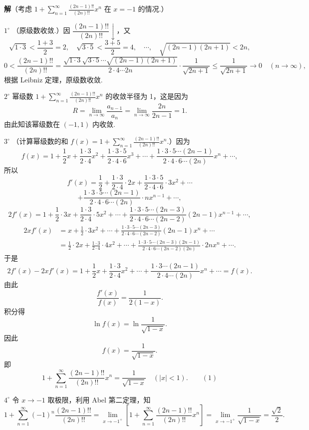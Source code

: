 \documentclass[UTF8,12pt,a4paper,fontset=fandol]{ctexart}
\begin{document}
\noindent\textbf{解}\quad （考虑 $\displaystyle 1+\sum_{n=1}^{\infty}\frac{(2n-1)!!}{(2n)!!}x^n$ 在 $x=-1$ 的情况.）

$1^\circ$ （原级数收敛.）因 $\dfrac{(2n-1)!!}{(2n)!!}\downarrow$，又
\[
  \sqrt{1\cdot3}<\frac{1+3}{2}=2,\quad
  \sqrt{3\cdot5}<\frac{3+5}{2}=4,\quad\cdots,\quad
  \sqrt{(2n-1)(2n+1)}<2n,
\]
\[
  0<\frac{(2n-1)!!}{(2n)!!}
  =\frac{\sqrt{1\cdot3}\sqrt{3\cdot5}\cdots\sqrt{(2n-1)(2n+1)}}{2\cdot4\cdots2n}\cdot\frac1{\sqrt{2n+1}}
  \le\frac1{\sqrt{2n+1}}\to0\quad(n\to\infty),
\]
根据 Leibniz 定理，原级数收敛.

$2^\circ$ 幂级数 $\displaystyle 1+\sum_{n=1}^{\infty}\frac{(2n-1)!!}{(2n)!!}x^n$ 的收敛半径为 1，这是因为
\[
  R=\lim_{n\to\infty}\frac{a_{n-1}}{a_n}
  =\lim_{n\to\infty}\frac{2n}{2n-1}=1.
\]
由此知该幂级数在 $(-1,1)$ 内收敛.

$3^\circ$ （计算幂级数的和
$\displaystyle f(x)=1+\sum_{n=1}^{\infty}\frac{(2n-1)!!}{(2n)!!}x^n$.）因为
\[
  f(x)=1+\frac12x+\frac{1\cdot3}{2\cdot4}x^2
  +\frac{1\cdot3\cdot5}{2\cdot4\cdot6}x^3+\cdots
  +\frac{1\cdot3\cdot5\cdots(2n-1)}{2\cdot4\cdot6\cdots(2n)}x^n+\cdots,
\]
所以
\[
  f'(x)=\frac12+\frac{1\cdot3}{2\cdot4}\cdot2x
  +\frac{1\cdot3\cdot5}{2\cdot4\cdot6}\cdot3x^2+\cdots
\]
\[
  +\frac{1\cdot3\cdot5\cdots(2n-1)}{2\cdot4\cdot6\cdots(2n)}\cdot nx^{n-1}+\cdots,
\]
\[
  2f'(x)=1+\frac12\cdot3x+\frac{1\cdot3}{2\cdot4}\cdot5x^2+\cdots
  +\frac{1\cdot3\cdot5\cdots(2n-3)}{2\cdot4\cdot6\cdots(2n-2)}(2n-1)x^{n-1}+\cdots,
\]
\[
\begin{aligned}
2xf'(x)&=x+\frac12\cdot3x^2+\cdots
+\frac{1\cdot3\cdot5\cdots(2n-3)}{2\cdot4\cdot6\cdots(2n-2)}(2n-1)x^n+\cdots\\
&=\frac12\cdot2x+\frac{1\cdot3}{2\cdot4}\cdot4x^2+\cdots
+\frac{1\cdot3\cdot5\cdots(2n-3)(2n-1)}{2\cdot4\cdot6\cdots(2n-2)(2n)}\cdot2nx^n+\cdots.
\end{aligned}
\]
于是
\[
  2f'(x)-2xf'(x)=1+\frac12x+\frac{1\cdot3}{2\cdot4}x^2+\cdots
  +\frac{1\cdot3\cdots(2n-1)}{2\cdot4\cdots(2n)}x^n+\cdots=f(x).
\]
由此
\[
  \frac{f'(x)}{f(x)}=\frac1{2(1-x)}.
\]
积分得
\[
  \ln f(x)=\ln\frac1{\sqrt{1-x}}.
\]
因此
\[
  f(x)=\frac1{\sqrt{1-x}}.
\]
即
\[
  1+\sum_{n=1}^{\infty}\frac{(2n-1)!!}{(2n)!!}x^n=\frac1{\sqrt{1-x}}\quad(|x|<1). \qquad(1)
\]

$4^\circ$ 令 $x\to-1$ 取极限，利用 Abel 第二定理，知
\[
  1+\sum_{n=1}^{\infty}(-1)^n\frac{(2n-1)!!}{(2n)!!}
  =\lim_{x\to-1^+}\left[1+\sum_{n=1}^{\infty}\frac{(2n-1)!!}{(2n)!!}x^n\right]
  =\lim_{x\to-1^+}\frac1{\sqrt{1-x}}=\frac{\sqrt2}{2}.
\]
\end{document}
